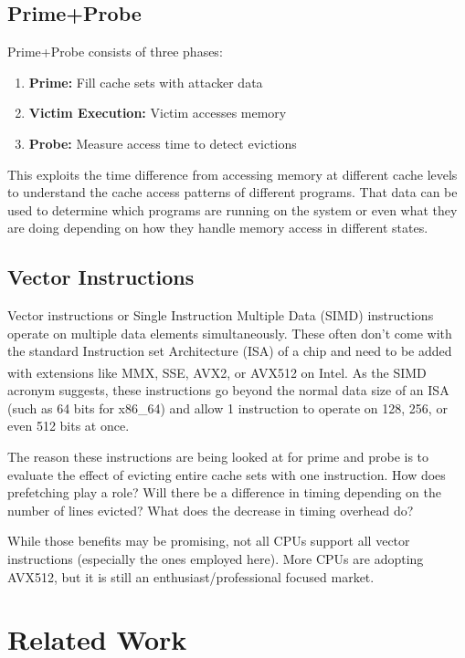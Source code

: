 \documentclass[article]{IEEEtran}
\begin{document}
\subsection{Prime+Probe}
Prime+Probe consists of three phases:
\noindent\begin{enumerate}
    \item \textbf{Prime:} Fill cache sets with attacker data
    \item \textbf{Victim Execution:} Victim accesses memory
    \item \textbf{Probe:} Measure access time to detect evictions
\end{enumerate}

\noindent This exploits the time difference from accessing memory at different cache levels to understand the cache access patterns of different programs. That data can be used to determine which programs are running on the system or even what they are doing depending on how they handle memory access in different states.

\subsection{Vector Instructions}
Vector instructions or Single Instruction Multiple Data (SIMD) instructions operate on multiple data elements simultaneously. These often don't come with the standard Instruction set Architecture (ISA) of a chip and need to be added with extensions like MMX, SSE, AVX2, or AVX512 on Intel\textsuperscript{\tiny\textregistered}. As the SIMD acronym suggests, these instructions go beyond the normal data size of an ISA (such as 64 bits for x86\_64) and allow 1 instruction to operate on 128, 256, or even 512 bits at once.

The reason these instructions are being looked at for prime and probe is to evaluate the effect of evicting entire cache sets with one instruction. How does prefetching play a role? Will there be a difference in timing depending on the number of lines evicted? What does the decrease in timing overhead do?

While those benefits may be promising, not all CPUs support all vector instructions (especially the ones employed here). More CPUs are adopting AVX512, but it is still an enthusiast/professional focused market.

\section{Related Work}
\end{document}
